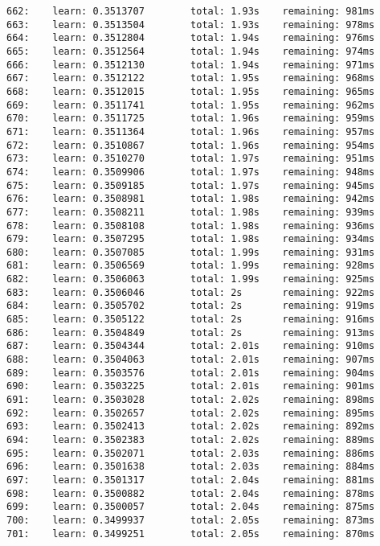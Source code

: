 \documentclass[11pt]{article}
\begin{document}
\begin{Verbatim}[commandchars=\\\{\}]
662:    learn: 0.3513707        total: 1.93s    remaining: 981ms
663:    learn: 0.3513504        total: 1.93s    remaining: 978ms
664:    learn: 0.3512804        total: 1.94s    remaining: 976ms
665:    learn: 0.3512564        total: 1.94s    remaining: 974ms
666:    learn: 0.3512130        total: 1.94s    remaining: 971ms
667:    learn: 0.3512122        total: 1.95s    remaining: 968ms
668:    learn: 0.3512015        total: 1.95s    remaining: 965ms
669:    learn: 0.3511741        total: 1.95s    remaining: 962ms
670:    learn: 0.3511725        total: 1.96s    remaining: 959ms
671:    learn: 0.3511364        total: 1.96s    remaining: 957ms
672:    learn: 0.3510867        total: 1.96s    remaining: 954ms
673:    learn: 0.3510270        total: 1.97s    remaining: 951ms
674:    learn: 0.3509906        total: 1.97s    remaining: 948ms
675:    learn: 0.3509185        total: 1.97s    remaining: 945ms
676:    learn: 0.3508981        total: 1.98s    remaining: 942ms
677:    learn: 0.3508211        total: 1.98s    remaining: 939ms
678:    learn: 0.3508108        total: 1.98s    remaining: 936ms
679:    learn: 0.3507295        total: 1.98s    remaining: 934ms
680:    learn: 0.3507085        total: 1.99s    remaining: 931ms
681:    learn: 0.3506569        total: 1.99s    remaining: 928ms
682:    learn: 0.3506063        total: 1.99s    remaining: 925ms
683:    learn: 0.3506046        total: 2s       remaining: 922ms
684:    learn: 0.3505702        total: 2s       remaining: 919ms
685:    learn: 0.3505122        total: 2s       remaining: 916ms
686:    learn: 0.3504849        total: 2s       remaining: 913ms
687:    learn: 0.3504344        total: 2.01s    remaining: 910ms
688:    learn: 0.3504063        total: 2.01s    remaining: 907ms
689:    learn: 0.3503576        total: 2.01s    remaining: 904ms
690:    learn: 0.3503225        total: 2.01s    remaining: 901ms
691:    learn: 0.3503028        total: 2.02s    remaining: 898ms
692:    learn: 0.3502657        total: 2.02s    remaining: 895ms
693:    learn: 0.3502413        total: 2.02s    remaining: 892ms
694:    learn: 0.3502383        total: 2.02s    remaining: 889ms
695:    learn: 0.3502071        total: 2.03s    remaining: 886ms
696:    learn: 0.3501638        total: 2.03s    remaining: 884ms
697:    learn: 0.3501317        total: 2.04s    remaining: 881ms
698:    learn: 0.3500882        total: 2.04s    remaining: 878ms
699:    learn: 0.3500057        total: 2.04s    remaining: 875ms
700:    learn: 0.3499937        total: 2.05s    remaining: 873ms
701:    learn: 0.3499251        total: 2.05s    remaining: 870ms

\end{Verbatim}
\end{document}
